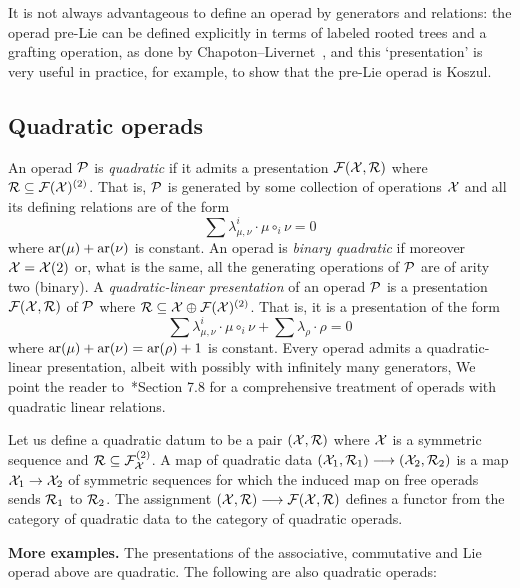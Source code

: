 \begin{note} It is not always advantageous
to define an operad by generators and relations:
the operad pre-Lie can be defined explicitly
in terms of labeled rooted trees and a grafting
operation, as done by Chapoton--Livernet~\cite{Chapoton2001}, and
this `presentation' is very useful in practice,
for example, to show that the pre-Lie operad
is Koszul.
\end{note}

\subsection{Quadratic operads}
An operad ${\mathcal{P}}$ is \emph{quadratic} if it admits a presentation
$\mathcal{F}(\mathcal{X},\mathcal{R})$ where $\mathcal{R} \subseteq \mathcal{F}(\mathcal{X})^{(2)}$. 
That is, ${\mathcal{P}}$ is generated by some collection of
operations $\mathcal{X}$ and all its defining relations are of the form
\[ \sum \lambda_{\mu,\nu}^i\cdot \mu \circ_i \nu = 0  \] 
where $\operatorname{ar}(\mu)+\operatorname{ar}(\nu)$ is constant. An operad is
\emph{binary quadratic} if moreover $\mathcal{X} = \mathcal{X}(2)$ or,
what is the same, all the generating operations of ${\mathcal{P}}$
are of arity two (binary). 
 A \emph{quadratic-linear presentation} of an operad ${\mathcal{P}}$
is a presentation $\mathcal{F}(\mathcal{X},\mathcal{R})$ of ${\mathcal{P}}$ where $\mathcal{R} 
\subseteq \mathcal{X} \oplus \mathcal{F}(\mathcal{X})^{(2)}$. That is, it is
a presentation of the form
\[ \sum \lambda_{\mu,\nu}^i \cdot\mu \circ_i \nu 
 + \sum \lambda_\rho \cdot \rho = 0   \] 
 where $\operatorname{ar}(\mu)+\operatorname{ar}(\nu) = \operatorname{ar}(\rho)+1$ is constant.
 Every operad admits a quadratic-linear
presentation, albeit with possibly with infinitely many generators, 
We point the reader to~\cite{Loday2012}*{Section 7.8} for a comprehensive treatment of operads
with quadratic linear relations.
 
 Let us define a quadratic datum to be a pair $(\mathcal{X},\mathcal{R})$
 where $\mathcal{X}$ is a symmetric sequence and $\mathcal{R}\subseteq
 \mathcal{F}_{\mathcal{X}}^{(2)}$. A map of quadratic data $(\mathcal{X}_1,\mathcal{R}_1) 
 \longrightarrow (\mathcal{X}_2,\mathcal{R}_2)$ is a map $\mathcal{X}_1
 \to \mathcal{X}_2$ of symmetric sequences for which the induced
 map on free operads sends $\mathcal{R}_1$ to $\mathcal{R}_2$. The 
 assignment $(\mathcal{X},\mathcal{R}) \longrightarrow \mathcal{F}(\mathcal{X},\mathcal{R})$
 defines a functor from the category of quadratic data
 to the category of quadratic operads.
 
 \bigskip
 
\textbf{More examples.} The presentations of the 
associative, commutative and Lie operad above are
quadratic. The following are also quadratic operads:

